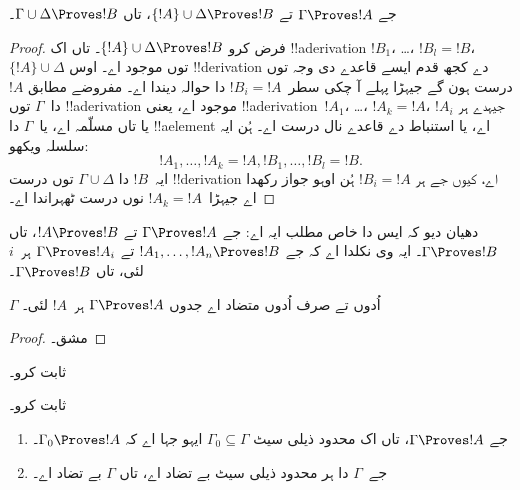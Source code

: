 \documentclass[../../../include/open-logic-section]{subfiles}
\begin{document}
\begin{prop}[تعدیت]
جے $\Gamma \Proves !A$ تے $\{!A\} \cup \Delta \Proves
!B$، تاں $\Gamma \cup \Delta \Proves !B$۔
\end{prop}

\begin{proof}
  فرض کرو $\{!A\} \cup \Delta \Proves !B$۔ تاں اک
  !!a{derivation} $!B_1$، \dots، $!B_l = !B$،~$\{!A\} \cup
  \Delta$ توں موجود اے۔ اوس !!{derivation} دے کجھ قدم ایسے
  قاعدے دی وجہ توں درست ہون گے جیہڑا پہلے آ چکی سطر~$!B_i = !A$
  دا حوالہ دیندا اے۔ مفروضے مطابق $!A$ دا~$\Gamma$ توں
  !!a{derivation} موجود اے، یعنی !!a{derivation}~$!A_1$، \dots،
  $!A_k = !A$، جیہدے ہر $!A_i$ یا تاں مسلّمہ اے، یا~$\Gamma$
  دا !!a{element} اے، یا استنباط دے قاعدے نال درست اے۔ ہُن
  ایہ سلسلہ ویکھو:
  \[
  !A_1, \dots, !A_k = !A, !B_1, \dots, !B_l = !B.
  \]
  ایہ~$!B$ دا $\Gamma \cup \Delta$ توں درست !!{derivation} اے،
  کیوں جے ہر $!B_i = !A$ ہُن اوہو جواز رکھدا اے جیہڑا~$!A_k = !A$
  نوں درست ٹھہراندا اے۔
\end{proof}

دھیان دیو کہ ایس دا خاص مطلب ایہ اے: جے $\Gamma \Proves !A$ تے $!A
\Proves !B$، تاں $\Gamma \Proves !B$۔ ایہ وی نکلدا اے کہ جے $!A_1,
\dots, !A_n \Proves !B$ تے $\Gamma \Proves !A_i$ ہر~$i$ لئی، تاں
$\Gamma \Proves !B$۔

\begin{prop}
$\Gamma$ اُدوں تے صرف اُدوں متضاد اے جدوں $\Gamma \Proves !A$ ہر~$!A$ لئی۔
\end{prop}

\begin{proof}
مشق۔
\end{proof}

\begin{prob}
 ثابت کرو۔
\end{prob}
\tagendprob

\begin{prob}
 ثابت کرو۔
\end{prob}
\tagendprob

\begin{prop}
  \begin{enumerate}
  \item جے $\Gamma \Proves !A$، تاں اک محدود ذیلی سیٹ $\Gamma_0
    \subseteq \Gamma$ ایہو جہا اے کہ $\Gamma_0 \Proves !A$۔
  \item جے~$\Gamma$ دا ہر محدود ذیلی سیٹ بے تضاد اے، تاں
    $\Gamma$ بے تضاد اے۔
  \end{enumerate}
\end{prop}
\end{document}
